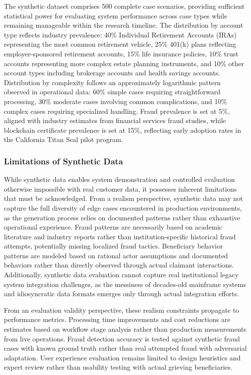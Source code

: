 The synthetic dataset comprises 500 complete case scenarios, providing sufficient statistical power for evaluating system performance across case types while remaining manageable within the research timeline. The distribution by account type reflects industry prevalence: 40\% Individual Retirement Accounts (IRAs) representing the most common retirement vehicle, 25\% 401(k) plans reflecting employer-sponsored retirement accounts, 15\% life insurance policies, 10\% trust accounts representing more complex estate planning instruments, and 10\% other account types including brokerage accounts and health savings accounts. Distribution by complexity follows an approximately logarithmic pattern observed in operational data: 60\% simple cases requiring straightforward processing, 30\% moderate cases involving common complications, and 10\% complex cases requiring specialized handling. Fraud prevalence is set at 5\%, aligned with industry estimates from financial services fraud studies, while blockchain certificate prevalence is set at 15\%, reflecting early adoption rates in the California Titan Seal pilot program.

\subsubsection{Limitations of Synthetic Data}

While synthetic data enables system demonstration and controlled evaluation otherwise impossible with real customer data, it possesses inherent limitations that must be acknowledged. From a realism perspective, synthetic data may not capture the full diversity of edge cases encountered in production environments, as the generation process relies on documented patterns rather than exhaustive operational experience. Fraud patterns are necessarily based on academic literature and industry reports rather than institution-specific historical fraud attempts, potentially missing localized fraud tactics. Beneficiary behavior patterns are modeled based on rational actor assumptions and documented behaviors rather than directly observed through actual claimant interactions. Additionally, synthetic data evaluation cannot capture real institutional legacy system integration challenges, as the messiness of decades-old mainframe systems and idiosyncratic data formats emerges only through actual integration efforts.

From an evaluation validity perspective, these realism constraints propagate to performance metrics. Processing time improvements and cost reductions are estimates based on workflow stage analysis rather than production measurements from live operations. Fraud detection accuracy is tested against synthetic fraud cases with known ground truth rather than real attempted fraud with adversarial adaptation. User experience evaluation remains limited to design heuristics and expert review rather than usability testing with actual grieving beneficiaries.

